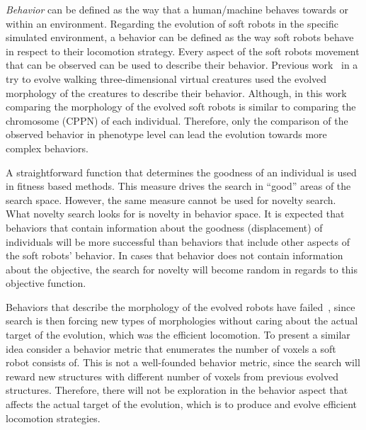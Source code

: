 \documentclass{sig-alternate}
\begin{document}
\emph{Behavior} can be defined as the way that a human/machine behaves towards or within an environment. Regarding the evolution of soft robots in the specific simulated environment, a behavior can be defined as the way soft robots behave in respect to their locomotion strategy. Every aspect of the soft robots movement that can be observed can be used to describe their behavior. Previous work~\cite{lehman2011evolving} in a try to evolve walking three-dimensional virtual creatures used the evolved morphology of the creatures to describe their behavior. Although, in this work comparing the morphology of the evolved soft robots is similar to comparing the chromosome (CPPN) of each individual. Therefore, only the comparison of the observed behavior in phenotype level can lead the evolution towards more complex behaviors.

A straightforward function that determines the goodness of an individual is used in fitness based methods. This measure drives the search in ``good'' areas of the search space. However, the same measure cannot be used for novelty search. What novelty search looks for is novelty in behavior space. It is expected that behaviors that contain information about the goodness (displacement) of individuals will be more successful than behaviors that include other aspects of the soft robots' behavior. In cases that behavior does not contain information about the objective, the search for novelty will become random in regards to this objective function.

Behaviors that describe the morphology of the evolved robots have failed~\cite{lehman2011evolving}, since search is then forcing new types of morphologies without caring about the actual target of the evolution, which was the efficient locomotion. To present a similar idea consider a behavior metric that enumerates the number of voxels a soft robot consists of. This is not a well-founded behavior metric, since the search will reward new structures with different number of voxels from previous evolved structures. Therefore, there will not be exploration in the behavior aspect that affects the actual target of the evolution, which is to produce and evolve efficient locomotion strategies.
\end{document}
